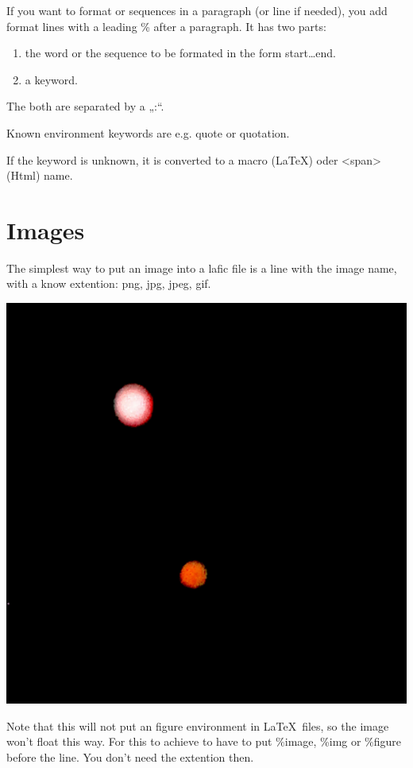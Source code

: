 \documentclass{scrartcl}
\begin{document}
If you want to format \xspace  or sequences in a paragraph (or
line if needed), you add format lines with a leading \% after
a paragraph. It has two parts:

\begin{enumerate}
\item the word or the sequence to be formated in the form
start…end. 
\item a keyword.
\end{enumerate}


The both are separated by a „:“.

Known environment keywords are e.g. quote or quotation.

If the keyword is unknown, it is converted to a macro
(LaTeX) oder <span> (Html) name.

\section{Images}

The simplest way to put an image into a lafic file is a
line with the image name, with a know extention: png, jpg,
jpeg, gif.

{\centering%
\includegraphics[width=.50\linewidth]{Image.png}
\\}

Note that this will not put an figure environment in \LaTeX\ 
files, so the image won't float this way. For this to
achieve to have to put \%image, \%img or \%figure before the
line. You don't need the extention then.
\end{document}
